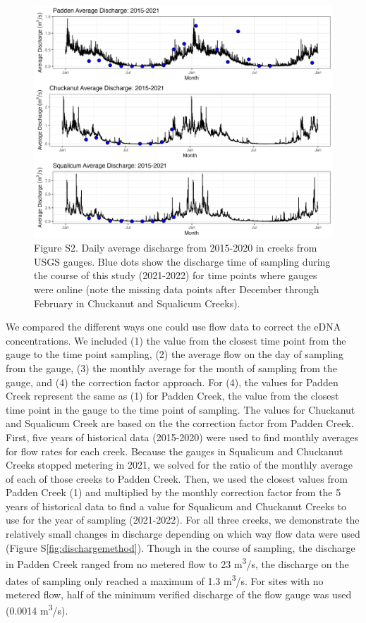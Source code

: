 \documentclass[
]{article}
\begin{document}
\begin{figure}
\centering
\includegraphics{../Output/SupplementalFigures/historical_flow_year_avg_sampling.png}
\caption{Figure S2. Daily average discharge from 2015-2020 in creeks
from USGS gauges. Blue dots show the discharge time of sampling during
the course of this study (2021-2022) for time points where gauges were
online (note the missing data points after December through February in
Chuckanut and Squalicum Creeks).\label{fig:dischargesupp}}
\end{figure}

We compared the different ways one could use flow data to correct the
eDNA concentrations. We included (1) the value from the closest time
point from the gauge to the time point sampling, (2) the average flow on
the day of sampling from the gauge, (3) the monthly average for the
month of sampling from the gauge, and (4) the correction factor
approach. For (4), the values for Padden Creek represent the same as (1)
for Padden Creek, the value from the closest time point in the gauge to
the time point of sampling. The values for Chuckanut and Squalicum Creek
are based on the the correction factor from Padden Creek. First, five
years of historical data (2015-2020) were used to find monthly averages
for flow rates for each creek. Because the gauges in Squalicum and
Chuckanut Creeks stopped metering in 2021, we solved for the ratio of
the monthly average of each of those creeks to Padden Creek. Then, we
used the closest values from Padden Creek (1) and multiplied by the
monthly correction factor from the 5 years of historical data to find a
value for Squalicum and Chuckanut Creeks to use for the year of sampling
(2021-2022). For all three creeks, we demonstrate the relatively small
changes in discharge depending on which way flow data were used (Figure
S\ref{fig:dischargemethod}). Though in the course of sampling, the
discharge in Padden Creek ranged from no metered flow to 23
m\textsuperscript{3}/s, the discharge on the dates of sampling only
reached a maximum of 1.3 m\textsuperscript{3}/s. For sites with no
metered flow, half of the minimum verified discharge of the flow gauge
was used (0.0014 m\textsuperscript{3}/s).
\end{document}
